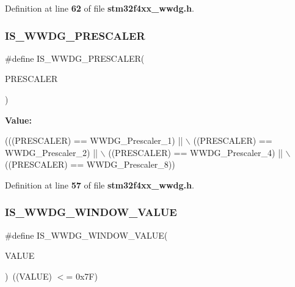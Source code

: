 Definition at line \textbf{ 62} of file \textbf{ stm32f4xx\+\_\+wwdg.\+h}.

\mbox{\label{group__WWDG__Prescaler_ga39070de0722a70f99a6fcfe8720b2dfd}} 
\subsubsection{I\+S\+\_\+\+W\+W\+D\+G\+\_\+\+P\+R\+E\+S\+C\+A\+L\+ER}
{\footnotesize\ttfamily \#define I\+S\+\_\+\+W\+W\+D\+G\+\_\+\+P\+R\+E\+S\+C\+A\+L\+ER(\begin{DoxyParamCaption}\item[{}]{P\+R\+E\+S\+C\+A\+L\+ER }\end{DoxyParamCaption})}

{\bfseries Value\+:}
\begin{DoxyCode}
(((PRESCALER) == WWDG_Prescaler_1) || \(\backslash\)
                                      ((PRESCALER) == WWDG_Prescaler_2) || \(\backslash\)
                                      ((PRESCALER) == WWDG_Prescaler_4) || \(\backslash\)
                                      ((PRESCALER) == WWDG_Prescaler_8))
\end{DoxyCode}


Definition at line \textbf{ 57} of file \textbf{ stm32f4xx\+\_\+wwdg.\+h}.

\mbox{\label{group__WWDG__Prescaler_gab6ea714a2380b7d6547ba97363887868}} 
\subsubsection{I\+S\+\_\+\+W\+W\+D\+G\+\_\+\+W\+I\+N\+D\+O\+W\+\_\+\+V\+A\+L\+UE}
{\footnotesize\ttfamily \#define I\+S\+\_\+\+W\+W\+D\+G\+\_\+\+W\+I\+N\+D\+O\+W\+\_\+\+V\+A\+L\+UE(\begin{DoxyParamCaption}\item[{}]{V\+A\+L\+UE }\end{DoxyParamCaption})~((V\+A\+L\+UE) $<$= 0x7\+F)}




